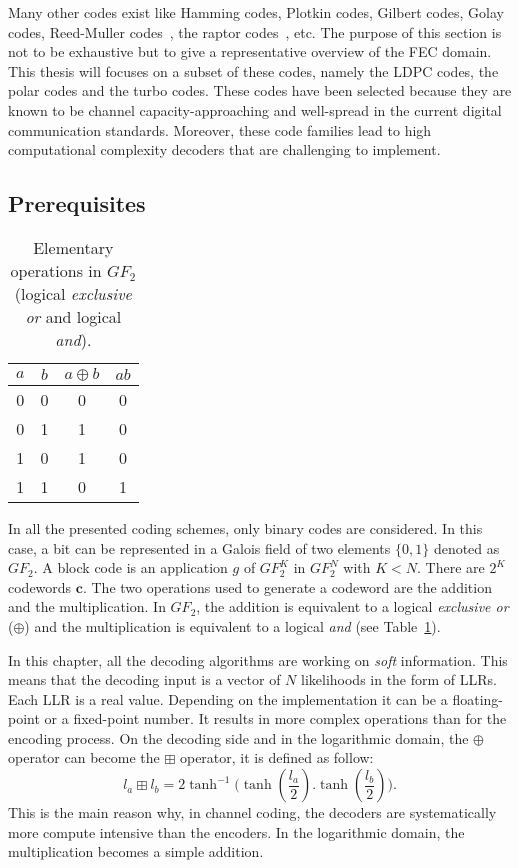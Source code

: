 Many other codes exist like Hamming codes, Plotkin codes, Gilbert codes, Golay
codes, Reed-Muller codes~\cite{Muller1954,Reed1954}, the raptor
codes~\cite{Shokrollahi2004}, etc. The purpose of this section is not to be
exhaustive but to give a representative overview of the FEC domain. This thesis
will focuses on a subset of these codes, namely the LDPC codes, the polar codes
and the turbo codes. These codes have been selected because they are known to
be channel capacity-approaching and well-spread in the current digital
communication standards. Moreover, these code families lead to high
computational complexity decoders that are challenging to implement.

\subsection{Prerequisites}

\begin{table}[htp]
  \centering
  \caption{Elementary operations in $GF_2$ (logical \emph{exclusive or} and
    logical \emph{and}).}
  \label{tab:ctx_gf2_operations}
   \begin{tabular}{c c c c}
   $a$ & $b$ & $a \oplus b$ & $ab$ \\
    \hline
    \hline
    0 & 0 & 0 & 0 \\
    0 & 1 & 1 & 0 \\
    1 & 0 & 1 & 0 \\
    1 & 1 & 0 & 1 \\
  \end{tabular}
\end{table}

In all the presented coding schemes, only binary codes are considered. In this
case, a bit can be represented in a Galois field of two elements $\{0, 1\}$
denoted as $GF_2$. A block code is an application $g$ of $GF_2^K$ in $GF_2^N$
with $K < N$. There are $2^K$ codewords $\bm{c}$. The two operations used to
generate a codeword are the addition and the multiplication. In $GF_2$, the
addition is equivalent to a logical \emph{exclusive or} ($\oplus$) and
the multiplication is equivalent to a logical \emph{and} (see
Table~\ref{tab:ctx_gf2_operations}).

In this chapter, all the decoding algorithms are working on \emph{soft}
information. This means that the decoding input is a vector of $N$ likelihoods
in the form of LLRs. Each LLR is a real value. Depending on the implementation
it can be a floating-point or a fixed-point number. It results in more complex
operations than for the encoding process. On the decoding side and in the
logarithmic domain, the $\oplus$ operator can become the $\boxplus$ operator, it
is defined as follow:
\begin{equation}
  l_a \boxplus l_b = 2\tanh^{-1}{\big(\tanh{(\frac{l_a}{2}).\tanh{(\frac{l_b}{2})}}\big)}.
\end{equation}
This is the main reason why, in channel coding, the decoders are systematically
more compute intensive than the encoders. In the logarithmic domain, the
multiplication becomes a simple addition.

